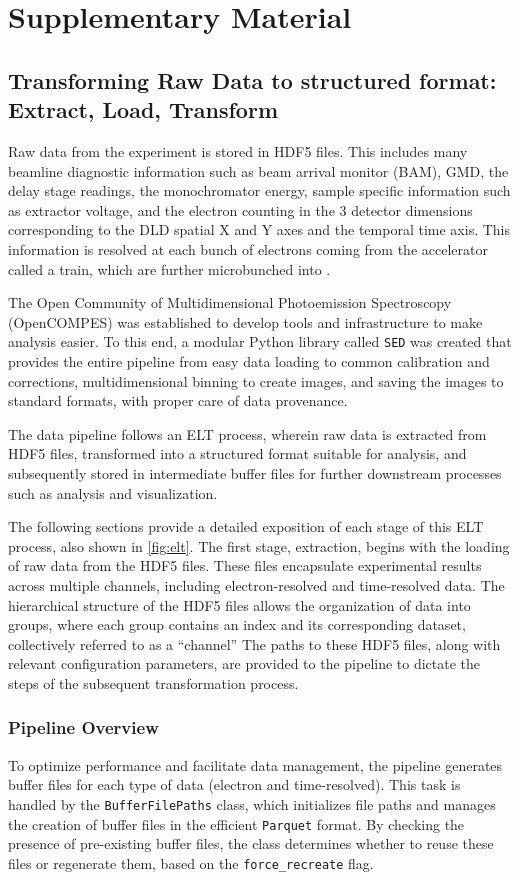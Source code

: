 \chapter{Supplementary Material}
\section{Transforming Raw Data to structured format: Extract, Load, Transform}\label{sec:elt}
Raw data from the experiment is stored in HDF5 files. This includes many \gls{beamline} diagnostic information such as beam arrival monitor (BAM), \gls{GMD}, the delay stage readings, the monochromator energy, sample specific information such as extractor voltage, and the electron counting in the 3 detector dimensions corresponding to the \gls{DLD} spatial X and Y axes and the temporal time axis. This information is resolved at each bunch of electrons coming from the accelerator called a \gls{train}, which are further microbunched into .

The Open Community of Multidimensional Photoemission Spectroscopy (OpenCOMPES) was established to develop tools and infrastructure to make analysis easier. To this end, a modular Python library called \texttt{SED} was created that provides the entire pipeline from easy data loading to common calibration and corrections, multidimensional binning to create images, and saving the images to standard formats, with proper care of data provenance.

The data pipeline follows an \gls{ELT} process, wherein raw data is extracted from HDF5 files, transformed into a structured format suitable for analysis, and subsequently stored in intermediate buffer files for further downstream processes such as analysis and visualization.

The following sections provide a detailed exposition of each stage of this \gls{ELT} process, also shown in \cref{fig:elt}. The first stage, extraction, begins with the loading of raw data from the HDF5 files. These files encapsulate experimental results across multiple channels, including electron-resolved and time-resolved data. The hierarchical structure of the HDF5 files allows the organization of data into groups, where each group contains an index and its corresponding dataset, collectively referred to as a “channel” The paths to these HDF5 files, along with relevant configuration parameters, are provided to the pipeline to dictate the steps of the subsequent transformation process.

\subsection*{Pipeline Overview}
To optimize performance and facilitate data management, the pipeline generates buffer files for each type of data (electron and time-resolved). This task is handled by the \texttt{BufferFilePaths} class, which initializes file paths and manages the creation of buffer files in the efficient \texttt{Parquet} format. By checking the presence of pre-existing buffer files, the class determines whether to reuse these files or regenerate them, based on the \texttt{force\_recreate} flag.

